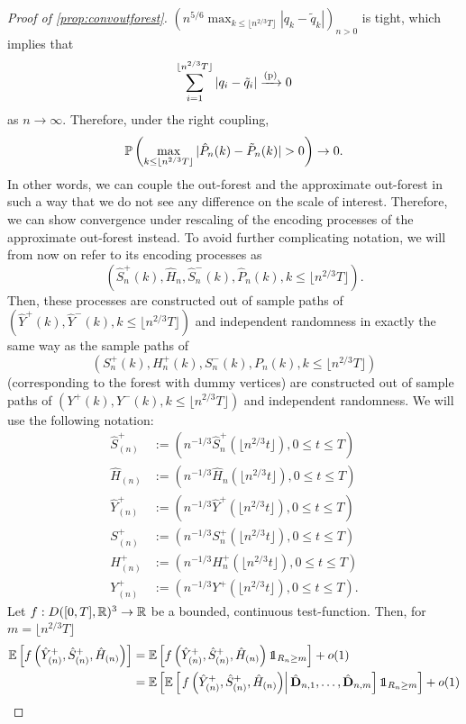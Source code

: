 \begin{proof}[Proof of \cref{prop:convoutforest}]
$\left(n^{5/6}\max_{k\leq \lfloor n^{2/3}T\rfloor }|q_k-\tilde{q}_k|\right)_{n>0}$ is tight, which implies that 
$$\sum_{i=1}^{\lfloor n^{2/3}T\rfloor }|q_i-\tilde{q}_i|\xrightarrow[]{\mathrm{(p)}}0$$
as $n\to \infty$. 
Therefore, under the right coupling, 
$$\P\left(\max_{k\leq \lfloor n^{2/3} T \rfloor}|\hat{P}_n(k)-\tilde{P}_n(k)|>0\right)\to 0.$$
In other words, we can couple the out-forest and the approximate out-forest in such a way that we do not see any difference on the scale of interest. Therefore, we can show convergence under rescaling of the encoding processes of the approximate out-forest instead. To avoid further complicating notation, we will from now on refer to its encoding processes as $$(\hat{S}^{+}_n(k),\hat{H}_n, \hat{S}^-_n(k), \hat{P}_n(k),k\leq \lfloor n^{2/3}T\rfloor).$$ Then, these processes are constructed out of sample paths of $(\hat{Y}^+(k),\hat{Y}^-(k), k\leq \lfloor n^{2/3}T\rfloor )$ and independent randomness in exactly the same way as the sample paths of $$({S}_n^{+}(k),{H}_n^+(k),{S}_n^-(k),P_n(k), k \leq \lfloor n^{2/3}T\rfloor )$$  (corresponding to the forest with dummy vertices) are constructed out of sample paths of $(Y^+(k),Y^-(k), k\leq \lfloor n^{2/3}T\rfloor )$ and independent randomness. 
We will use the following notation:\begin{align*}
    \hat{S}^{+}_{(n)}&:=\left(n^{-1/3}\hat{S}^{+}_n\left(\lfloor n^{2/3} t \rfloor\right),0\leq t \leq T\right)\\
    \hat{H}_{(n)}&:=\left(n^{-1/3}\hat{H}_n\left(\lfloor n^{2/3} t \rfloor\right),0\leq t \leq T\right)\\
    \hat{Y}^+_{(n)}&:=\left(n^{-1/3}\hat{Y}^+\left(\lfloor n^{2/3} t \rfloor\right),0\leq t \leq T\right)\\
     {S}^{+}_{(n)}&:=\left(n^{-1/3}{S}^{+}_n\left(\lfloor n^{2/3} t \rfloor\right),0\leq t \leq T\right)\\
    {H}^+_{(n)}&:=\left(n^{-1/3}{H}^+_n\left(\lfloor n^{2/3} t \rfloor\right),0\leq t \leq T\right)\\
    {Y}^+_{(n)}&:=\left(n^{-1/3}{Y}^+\left(\lfloor n^{2/3} t \rfloor\right),0\leq t \leq T\right).
\end{align*}
Let $f:D([0,T],{\mathbb R})^3\to {\mathbb R}$ be a bounded, continuous test-function. Then, for $m=\lfloor n^{2/3}T\rfloor$
\begin{align*}\E\left[f\left(\hat{Y}^+_{(n)}, \hat{S}^+_{(n)},  \hat{H}_{(n)}\right) \right]&= \E\left[f\left(\hat{Y}^+_{(n)}, \hat{S}^+_{(n)},  \hat{H}_{(n)}\right) \one_{R_n\geq m} \right]+o(1)\\
&=\E\left[ \E\left[\left. f\left(\hat{Y}^+_{(n)},\hat{S}^+_{(n)},  \hat{H}_{(n)}\right)\right|\hat{\mathbf{D}}_{n,1},\dots, \hat{\mathbf{D}}_{n,m} \right]\one_{R_n\geq m} \right]+o(1)

\end{align*}
\end{proof}
